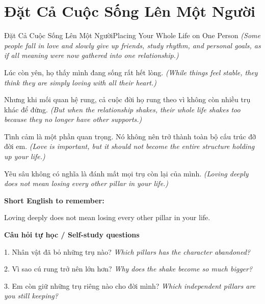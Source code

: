 \section{Đặt Cả Cuộc Sống Lên Một Người}
\begin{truyen}{Đặt Cả Cuộc Sống Lên Một Người}{Placing Your Whole Life on One Person}
\textit{(Some people fall in love and slowly give up friends, study rhythm, and personal goals, as if all meaning were now gathered into one relationship.)}

Lúc còn yên, họ thấy mình đang sống rất hết lòng.
\textit{(While things feel stable, they think they are simply loving with all their heart.)}

Nhưng khi mối quan hệ rung, cả cuộc đời họ rung theo vì không còn nhiều trụ khác để đứng.
\textit{(But when the relationship shakes, their whole life shakes too because they no longer have other supports.)}

Tình cảm là một phần quan trọng. Nó không nên trở thành toàn bộ cấu trúc đỡ đời em.
\textit{(Love is important, but it should not become the entire structure holding up your life.)}

\end{truyen}

\begin{baihoc}
Yêu sâu không có nghĩa là đánh mất mọi trụ còn lại của mình.
\textit{(Loving deeply does not mean losing every other pillar in your life.)}
\end{baihoc}

\begin{ghinhoanh}
\textbf{Short English to remember:}

Loving deeply does not mean losing every other pillar in your life.

\end{ghinhoanh}

\begin{tuhocnhanh}
\textbf{Câu hỏi tự học / Self-study questions}

1. Nhân vật đã bỏ những trụ nào? \textit{Which pillars has the character abandoned?}

2. Vì sao cú rung trở nên lớn hơn? \textit{Why does the shake become so much bigger?}

3. Em còn giữ những trụ riêng nào cho đời mình? \textit{Which independent pillars are you still keeping?}
\end{tuhocnhanh}
\ngancach

